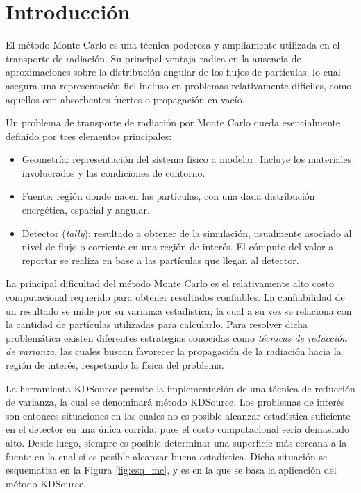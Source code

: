 \section{Introducción}

El método Monte Carlo es una técnica poderosa y ampliamente utilizada en el transporte de radiación. Su principal ventaja radica en la ausencia de aproximaciones sobre la distribución angular de los flujos de partículas, lo cual asegura una representación fiel incluso en problemas relativamente difíciles, como aquellos con absorbentes fuertes o propagación en vacío.

Un problema de transporte de radiación por Monte Carlo queda esencialmente definido por tres elementos principales:
\begin{itemize}
    \item Geometría: representación del sistema físico a modelar. Incluye los materiales involucrados y las condiciones de contorno.
    \item Fuente: región donde nacen las partículas, con una dada distribución energética, espacial y angular.
    \item Detector (\emph{tally}): resultado a obtener de la simulación, usualmente asociado al nivel de flujo o corriente en una región de interés. El cómputo del valor a reportar se realiza en base a las partículas que llegan al detector.
\end{itemize}

La principal dificultad del método Monte Carlo es el relativamente alto costo computacional requerido para obtener resultados confiables. La confiabilidad de un resultado se mide por su varianza estadística, la cual a su vez se relaciona con la cantidad de partículas utilizadas para calcularlo. Para resolver dicha problemática existen diferentes estrategias conocidas como \emph{técnicas de reducción de varianza}, las cuales buscan favorecer la propagación de la radiación hacia la región de interés, respetando la física del problema.

La herramienta KDSource permite la implementación de una técnica de reducción de varianza, la cual se denominará método KDSource. Los problemas de interés son entonces situaciones en las cuales no es posible alcanzar estadística suficiente en el detector en una única corrida, pues el costo computacional sería demasiado alto. Desde luego, siempre es posible determinar una superficie más cercana a la fuente en la cual sí es posible alcanzar buena estadística. Dicha situación se esquematiza en la Figura \ref{fig:esq_mc}, y es en la que se basa la aplicación del método KDSource.

